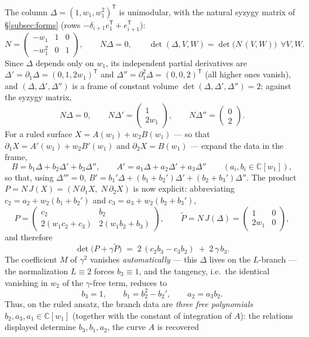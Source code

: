 \documentclass[11pt]{article}
\numberwithin{equation}{section}
\theoremstyle{plain}
\theoremstyle{definition}
\theoremstyle{remark}
\newcommand{\C}{\mathbb{C}}
\begin{document}
The column $\Delta=(1,w_1,w_1^2)^{\mathsf T}$ is unimodular, with the natural
syzygy matrix of \S\ref{subsec:forms} (rows
$-\delta_{i+1}e_1^{\mathsf T}+e_{i+1}^{\mathsf T}$):
\[
N=\begin{pmatrix}-w_1&1&0\\[1pt] -w_1^2&0&1\end{pmatrix},
\qquad N\Delta=0,\qquad
\det(\Delta,V,W)=\det\bigl(N\,(V,W)\bigr)\ \ \forall V,W .
\]
Since $\Delta$ depends only on $w_1$, its independent partial derivatives are
$\Delta'=\partial_1\Delta=(0,1,2w_1)^{\mathsf T}$ and
$\Delta''=\partial_1^2\Delta=(0,0,2)^{\mathsf T}$ (all higher ones vanish), and
$(\Delta,\Delta',\Delta'')$ is a frame of constant volume
$\det(\Delta,\Delta',\Delta'')=2$; against the syzygy matrix,
\[
N\Delta=0,\qquad
N\Delta'=\begin{pmatrix}1\\ 2w_1\end{pmatrix},\qquad
N\Delta''=\begin{pmatrix}0\\ 2\end{pmatrix}.
\]
For a ruled surface $X=A(w_1)+w_2B(w_1)$ --- so that
$\partial_1X=A'(w_1)+w_2B'(w_1)$ and $\partial_2X=B(w_1)$ --- expand the data
in the frame,
\[
B=b_1\Delta+b_2\Delta'+b_3\Delta'',\qquad
A'=a_1\Delta+a_2\Delta'+a_3\Delta''\qquad(a_i,b_i\in\C[w_1]),
\]
so that, using $\Delta'''=0$,
$B'=b_1'\Delta+(b_1+b_2')\Delta'+(b_2+b_3')\Delta''$. The product
$P=N\,J(X)=(N\,\partial_1X,\;N\,\partial_2X)$ is now explicit: abbreviating
$c_2=a_2+w_2(b_1+b_2')$ and $c_3=a_3+w_2(b_2+b_3')$,
\[
P=\begin{pmatrix}c_2 & b_2\\ 2(w_1c_2+c_3) & 2(w_1b_2+b_3)\end{pmatrix},
\qquad
\widetilde P=N\,J(\Delta)=\begin{pmatrix}1&0\\ 2w_1&0\end{pmatrix},
\]
and therefore
\[
\det\bigl(P+\gamma\widetilde P\bigr)\;=\;2\,(c_2b_3-c_3b_2)\;+\;2\,\gamma\,b_3 .
\]
The coefficient $M$ of $\gamma^2$ vanishes \emph{automatically} --- this
$\Delta$ lives on the $L$-branch --- the normalization $L\equiv2$ forces
$b_3\equiv1$, and the tangency, i.e.\ the identical vanishing in $w_2$ of the
$\gamma$-free term, reduces to
\[
b_3=1,\qquad b_1=b_2^2-b_2',\qquad a_2=a_3b_2 .
\]
Thus, on the ruled ansatz, the branch data are \emph{three free polynomials}
$b_2,a_3,a_1\in\C[w_1]$ (together with the constant of integration of $A$):
the relations displayed determine $b_3,b_1,a_2$, the curve $A$ is recovered
\end{document}
